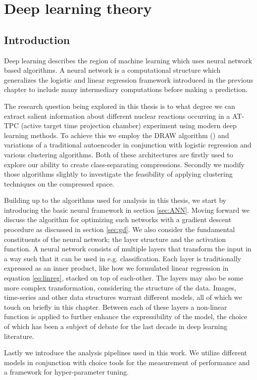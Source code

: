 \chapter{Deep learning theory}\label{ch:ml}
\section{Introduction}

Deep learning describes the region of machine learning which uses neural network based algorithms. A neural network is a computational structure which generalizes the logistic and linear regression framework introduced in the previous chapter to include many intermediary computations before making a prediction.

The research question being explored in this thesis is to what degree we can extract salient information about different nuclear reactions occurring in a AT-TPC (active target time projection chamber) experiment using modern deep learning methods. To achieve this we employ the DRAW algorithm (\cite{Gregor2015}) and variations of a traditional autoencoder in conjunction with logistic regression and various clustering algorithms. Both of these architectures are firstly used to explore our ability to create class-separating compressions. Secondly we modify those algorithms slightly to investigate the feasibility of applying clustering techniques on the compressed space. 

Building up to the algorithms used for analysis in this thesis, we start by introducing the basic neural framework in section \ref{sec:ANN}. Moving forward we discuss the algorithm for optimizing such networks with a gradient descent procedure as discussed in section \ref{sec:gd}. We also consider the fundamental constituents of the neural network; the layer structure and the activation function. A neural network consists of multiple layers that transform the input in a way such that it can be used in e.g. classification. Each layer is traditionally expressed as an inner product, like how we formulated linear regression in equation \ref{eq:linreg}, stacked on top of each-other. The layers may also be some more complex transformation, considering the structure of the data. Images, time-series and other data structures warrant different models, all of which we touch on briefly in this chapter. Between each of these layers a non-linear function is applied to further enhance the expressibility of the model, the choice of which has been a subject of debate for the last decade in deep learning literature.

Lastly we introduce the analysis pipelines used in this work. We utilize different models in conjunction with choice tools for the measurement of performance and a framework for hyper-parameter tuning. 